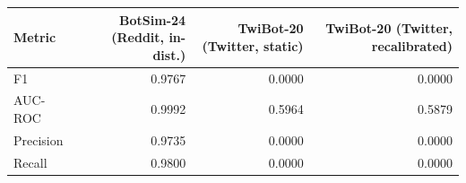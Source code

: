 \begin{tabular}{lrrr}
\toprule
Metric & BotSim-24 (Reddit, in-dist.) & TwiBot-20 (Twitter, static) & TwiBot-20 (Twitter, recalibrated) \\
\midrule
F1 & 0.9767 & 0.0000 & 0.0000 \\
AUC-ROC & 0.9992 & 0.5964 & 0.5879 \\
Precision & 0.9735 & 0.0000 & 0.0000 \\
Recall & 0.9800 & 0.0000 & 0.0000 \\
\bottomrule
\end{tabular}
